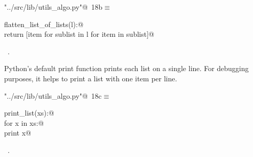 \documentclass[11.5pt]{report}
\begin{document}
\begin{flushleft} \small
\begin{minipage}{\linewidth}\label{scrap14}\raggedright\small
{} \verb@"../src/lib/utils_algo.py"@\nobreak\ {\footnotesize {18b}}$\equiv$
\vspace{-1ex}
\begin{list}{}{} \item
\mbox{}\verb@def flatten_list_of_lists(l):@\\
\mbox{}\verb@       return [item for sublist in l for item in sublist]@\\
\mbox{}\verb@@{\NWsep}
\end{list}
\vspace{-1.5ex}
\footnotesize
\begin{list}{}{\setlength{\itemsep}{-\parsep}\setlength{\itemindent}{-\leftmargin}}
\item \NWtxtFileDefBy\ .

\item{}
\end{list}
\end{minipage}\vspace{4ex}
\end{flushleft}

\vspace{-0.8cm}
\newchunk Python's default print function prints each list on a single line. For 
debugging purposes,  it helps to print a list with one item per line. 

\begin{flushleft} \small\label{scrap15}\raggedright\small
{} \verb@"../src/lib/utils_algo.py"@\nobreak\ {\footnotesize {18c}}$\equiv$
\vspace{-1ex}
\begin{list}{}{} \item
\mbox{}\verb@def print_list(xs):@\\
\mbox{}\verb@    for x in xs:@\\
\mbox{}\verb@        print x@\\
\mbox{}\verb@@{\NWsep}
\end{list}
\vspace{-1.5ex}
\footnotesize
\begin{list}{}{\setlength{\itemsep}{-\parsep}\setlength{\itemindent}{-\leftmargin}}
\item \NWtxtFileDefBy\ .

\item{}
\end{list}
\vspace{4ex}
\end{flushleft}
\end{document}
